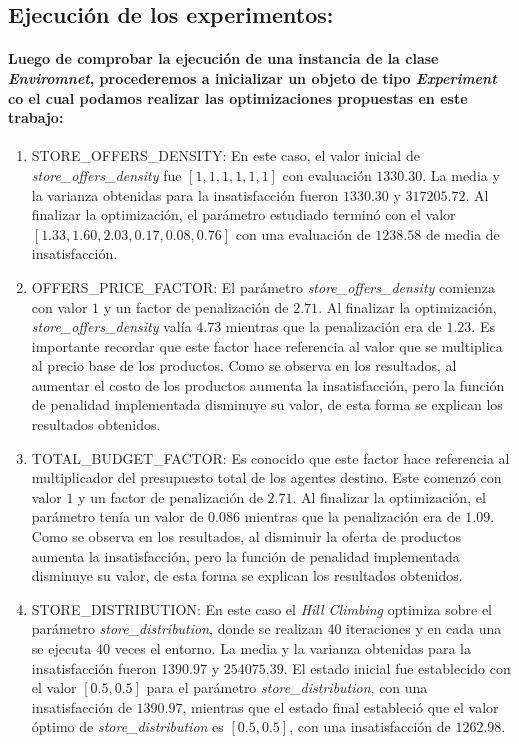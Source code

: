 \documentclass[12pt]{amsart}
\begin{document}
\subsection{Ejecución de los experimentos:}

\paragraph{Luego de comprobar la ejecución de una instancia de la clase \textit{Enviromnet}, procederemos a inicializar un objeto de tipo \textit{Experiment} co el cual podamos realizar las optimizaciones propuestas en este trabajo:}

\begin {enumerate}
				\item {STORE\_OFFERS\_DENSITY:  En este caso, el valor inicial de \textit{store\_offers\_density} fue $[1, 1, 1, 1, 1, 1]$ con evaluación $1330.30$. La media y la varianza obtenidas para la insatisfacción fueron $1330.30$ y $317205.72$. Al finalizar la optimización, el parámetro estudiado terminó con el valor $[1.33, 1.60, 2.03, 0.17, 0.08, 0.76]$ con una evaluación de $1238.58$ de media de insatisfacción.}
				\item {OFFERS\_PRICE\_FACTOR: El parámetro \textit{store\_offers\_density} comienza con valor $1$ y un factor de penalización de $2.71$. Al finalizar la optimización, \textit{store\_offers\_density} valía $4.73$ mientras que la penalización era de $1.23$. Es importante recordar que este factor hace referencia al valor que se multiplica al precio base de los productos. Como se observa en los resultados, al aumentar el costo de los productos aumenta la insatisfacción, pero la función de penalidad implementada disminuye su valor, de esta forma se explican los resultados obtenidos.}
				\item {TOTAL\_BUDGET\_FACTOR: Es conocido que este factor hace referencia al multiplicador del presupuesto total de los agentes destino. Este comenzó con valor $1$ y un factor de penalización de $2.71$. Al finalizar la optimización, el parámetro tenía un valor de $0.086$ mientras que la penalización era de $1.09$. Como se observa en los resultados, al disminuir la oferta de productos aumenta la insatisfacción, pero la función de penalidad implementada disminuye su valor, de esta forma se explican los resultados obtenidos.}
				\item {STORE\_DISTRIBUTION: En este caso el \textit{Hill Climbing} optimiza sobre el parámetro \textit{store\_distribution}, donde se realizan $40$ iteraciones y en cada una se ejecuta $40$ veces el entorno. La media y la varianza obtenidas para la insatisfacción fueron $1390.97$ y $254075.39$. El estado inicial fue establecido con el valor $[0.5, 0.5]$ para el parámetro \textit{store\_distribution}, con una insatisfacción de $1390.97$, mientras que el estado final estableció que el valor óptimo de \textit{store\_distribution} es $[0.5, 0.5]$, con una insatisfacción de $1262.98$.}
\end {enumerate}
\end{document}
